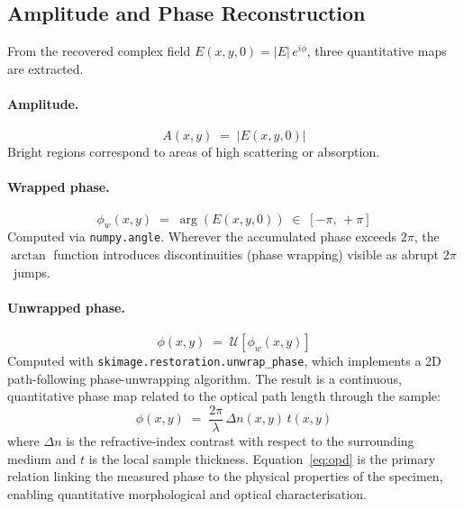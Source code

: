 \subsection{Amplitude and Phase Reconstruction}

From the recovered complex field $E(x,y,0) = |E|\,e^{i\phi}$,
three quantitative maps are extracted.

\paragraph{Amplitude.}
\begin{equation}
    A(x,y) \;=\; |E(x,y,0)|
\end{equation}
Bright regions correspond to areas of high scattering or absorption.

\paragraph{Wrapped phase.}
\begin{equation}
    \phi_w(x,y) \;=\; \arg\!\left(E(x,y,0)\right) \;\in\; [-\pi,\,+\pi]
\end{equation}
Computed via \texttt{numpy.angle}.
Wherever the accumulated phase exceeds $2\pi$, the $\arctan$ function
introduces discontinuities (phase wrapping) visible as abrupt $2\pi$~jumps.

\paragraph{Unwrapped phase.}
\begin{equation}
    \phi(x,y) \;=\; \mathcal{U}\!\left[\phi_w(x,y)\right]
\end{equation}
Computed with \texttt{skimage.restoration.unwrap\_phase}, which implements
a 2D path-following phase-unwrapping algorithm.
The result is a continuous, quantitative phase map related to the optical
path length through the sample:
\begin{equation}
    \phi(x,y)
    \;=\; \frac{2\pi}{\lambda}\,\Delta n(x,y)\,t(x,y)
    \label{eq:opd}
\end{equation}
where $\Delta n$ is the refractive-index contrast with respect to the
surrounding medium and $t$ is the local sample thickness.
Equation~\eqref{eq:opd} is the primary relation linking the measured phase
to the physical properties of the specimen, enabling quantitative
morphological and optical characterisation.

